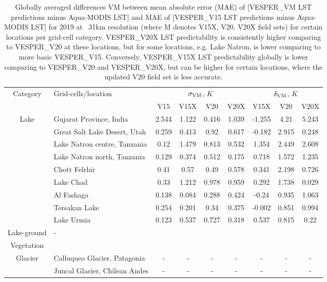 \documentclass[hess, twostagejnl]{copernicus}
\begin{document}
\begin{table}
	\begin{tabular}{clccccccc}
		\hline
		\multirow{2}{*}{Category} & \multirow{2}{*}{Grid-cells/location} & 	\multicolumn{4}{c}{$\sigma_{\rm VM}$, $K$} &\multicolumn{3}{c}{$\delta_{\rm VM}$, $K$} \\  
		&&V15  & V15X & V20 & V20X & V15X &V20 & V20X  \\
		\hline 
		\multirow{9}{*}{Lake}&Gujarat Province, India& 2.544 &1.122 &0.416 &1.039 & -1.255 &4.21& 5.243 \\
		&Great Salt Lake Desert, Utah&0.259 &0.413 &0.92 &0.617 & -0.182 &2.915 &0.248\\
		&Lake Natron centre, Tanzania&0.12 &1.479 &0.813& 0.532 & 1.354& 2.449& 2.608 \\
		&Lake Natron north, Tanzania&0.129 &0.374 &0.512& 0.175 & 0.718 &1.572 &1.235 \\
		&Chott Felrhir&0.41 &0.57& 0.49& 0.578 & 0.341 &2.198& 0.726 \\
		&Lake Chad&0.33 &1.212 &0.978 &0.959 & 0.292 &1.738 &0.029\\
		&Al Fashaga&0.138 &0.084 &0.288 &0.424 & -0.24& 0.935 &1.063 \\
		&Tersakan Lake&0.254 &0.201& 0.34 &0.375 & -0.002 &0.851 &0.994 \\
		&Lake Urmia&0.123& 0.537 &0.727 &0.318 & 0.537 &0.815 &0.22 \\
		\hline 
		Lake-ground&-& &  &  &  & & &   \\
		\hline
		Vegetation&& &  &  &  & & &   \\
		\hline 
		\multirow{2}{*}{Glacier}&Calluqueo Glacier, Patagonia&- &-&- &- & -&- &-\\
		&Juncal Glacier, Chilean Andes &-& -& - &- & - &-& - \\
		\bottomrule
	\end{tabular}
	\caption{Globally averaged differences VM between mean absolute error (MAE) of [VESPER\_VM LST predictions minus Aqua-MODIS LST] and MAE of [VESPER\_V15 LST predictions minus Aqua-MODIS LST] for 2019 at ~31km resolution (where M denotes V15X, V20, V20X field sets) for certain locations per grid-cell category. VESPER\_V20X LST predictability is consistently higher comparing to VESPER\_V20 at these locations, but for some locations, e.g. Lake Natron, is lower comparing to more basic VESPER\_V15. Conversely, VESPER\_V15X LST predictability globally is lower comparing to VESPER\_V20 and VESPER\_V20X, but can be higher for certain locations, where the updated V20 field set is less accurate.}
	\label{tab:categorisation2}
\end{table}
\end{document}
